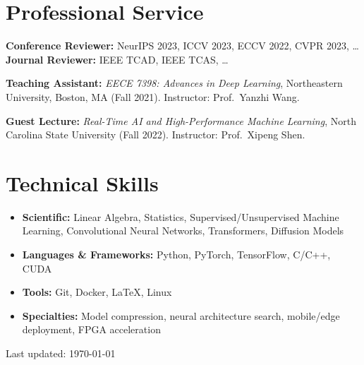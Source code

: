 \documentclass[11pt,letterpaper]{article}
\begin{document}
\section{Professional Service}

\noindent\textbf{Conference Reviewer:} NeurIPS 2023, ICCV 2023, ECCV 2022, CVPR 2023, \ldots \\
\textbf{Journal Reviewer:} IEEE TCAD, IEEE TCAS, \ldots

\noindent\textbf{Teaching Assistant:} \textit{EECE 7398: Advances in Deep Learning}, Northeastern University, Boston, MA (Fall 2021). Instructor: Prof.\ Yanzhi Wang.

\noindent\textbf{Guest Lecture:} \textit{Real-Time AI and High-Performance Machine Learning}, North Carolina State University (Fall 2022). Instructor: Prof.\ Xipeng Shen.

\section{Technical Skills}

\begin{itemize}
    \item \textbf{Scientific:} Linear Algebra, Statistics, Supervised/Unsupervised Machine Learning, Convolutional Neural Networks, Transformers, Diffusion Models
    \item \textbf{Languages \& Frameworks:} Python, PyTorch, TensorFlow, C/C++, CUDA
    \item \textbf{Tools:} Git, Docker, \LaTeX, Linux
    \item \textbf{Specialties:} Model compression, neural architecture search, mobile/edge deployment, FPGA acceleration
\end{itemize}

\vfill

\begin{center}
    \small\color{lightgray}
    Last updated: \today
\end{center}
\end{document}
